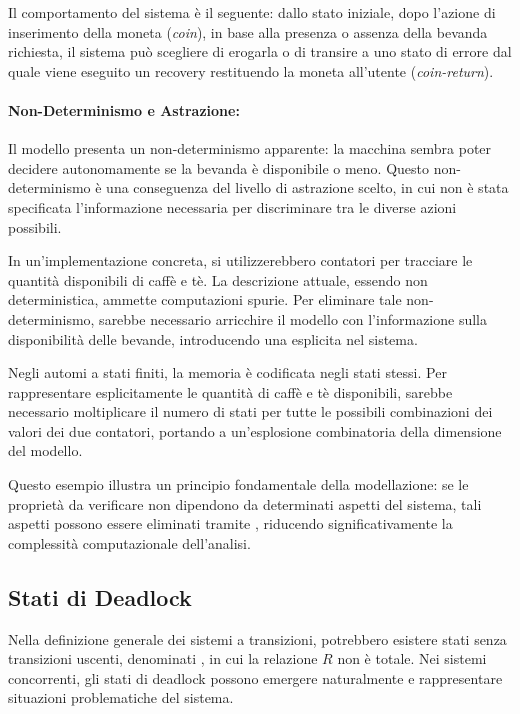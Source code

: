 Il comportamento del sistema è il seguente: dallo stato iniziale, dopo l'azione di inserimento della moneta (\textit{coin}), in base alla presenza o assenza della bevanda richiesta, il sistema può scegliere di erogarla o di transire a uno stato di errore dal quale viene eseguito un recovery restituendo la moneta all'utente (\textit{coin-return}).

\paragraph{Non-Determinismo e Astrazione:}
Il modello presenta un non-determinismo apparente: la macchina sembra poter decidere autonomamente se la bevanda è disponibile o meno. Questo non-determinismo è una conseguenza del livello di astrazione scelto, in cui non è stata specificata l'informazione necessaria per discriminare tra le diverse azioni possibili.

In un'implementazione concreta, si utilizzerebbero contatori per tracciare le quantità disponibili di caffè e tè. La descrizione attuale, essendo non deterministica, ammette computazioni spurie. Per eliminare tale non-determinismo, sarebbe necessario arricchire il modello con l'informazione sulla disponibilità delle bevande, introducendo una  esplicita nel sistema.

Negli automi a stati finiti, la memoria è codificata negli stati stessi. Per rappresentare esplicitamente le quantità di caffè e tè disponibili, sarebbe necessario moltiplicare il numero di stati per tutte le possibili combinazioni dei valori dei due contatori, portando a un'esplosione combinatoria della dimensione del modello.

Questo esempio illustra un principio fondamentale della modellazione: se le proprietà da verificare non dipendono da determinati aspetti del sistema, tali aspetti possono essere eliminati tramite , riducendo significativamente la complessità computazionale dell'analisi.

\subsection{Stati di Deadlock}

Nella definizione generale dei sistemi a transizioni, potrebbero esistere stati senza transizioni uscenti, denominati , in cui la relazione \(R\) non è totale. Nei sistemi concorrenti, gli stati di deadlock possono emergere naturalmente e rappresentare situazioni problematiche del sistema.

